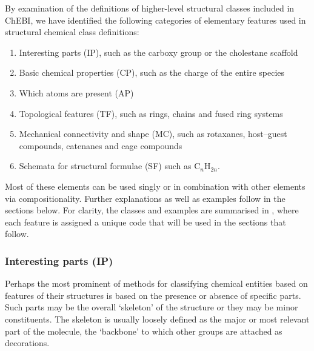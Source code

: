 \documentclass[10pt]{bmc_article}
\newenvironment{bmcformat}{\baselineskip20pt\sloppy\setboolean{publ}{false}}{\baselineskip20pt\sloppy}
\begin{document}
\begin{bmcformat}

By examination of the definitions of higher-level structural classes included in ChEBI, we have identified the following categories of elementary features used in structural chemical class definitions: 
\begin{enumerate}
	\item	Interesting parts (IP), such as the carboxy group or the cholestane scaffold
	\item	Basic chemical properties (CP), such as the charge of the entire species
	\item	Which atoms are present (AP)
	\item	Topological features (TF), such as rings, chains and fused ring systems
	\item Mechanical connectivity and shape (MC), such as rotaxanes, host--guest compounds, catenanes and cage compounds
	\item	Schemata for structural formulae (SF) such as C$_n$H$_{2n}$.
\end{enumerate}

Most of these elements can be used singly or in combination with other elements via compositionality.  Further explanations as well as examples follow in the sections below. For clarity, the classes and examples are summarised in \textit{}, where each feature is assigned a unique code that will be used in the sections that follow.

\subsubsection*{Interesting parts (IP)}


Perhaps the most prominent of methods for classifying chemical entities based on features of their structures is based on the presence or absence of specific parts.  Such parts may be the overall `skeleton' of the structure or they may be minor constituents. The skeleton is usually loosely defined as the major or most relevant part of the molecule, the `backbone' to which other groups are attached as decorations. 


\end{bmcformat}
\end{document}
